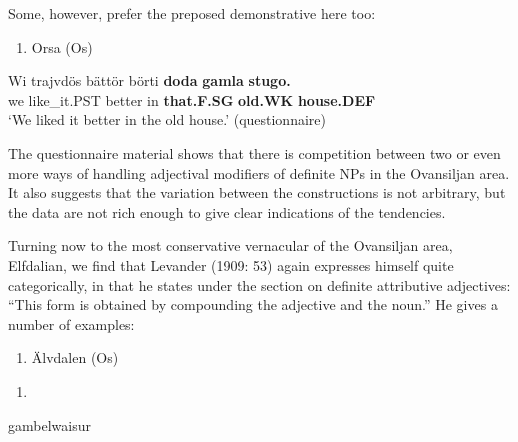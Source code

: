 Some, however, prefer the preposed demonstrative here too:

\begin{enumerate} %
\item 
Orsa (Os)

\end{enumerate} %
\ea\label{}
\gll Wi  trajvdös  bättör  börti  \textbf{doda} \textbf{gamla} \textbf{stugo.}\\


we  like\_it.PST  better  in  \textbf{that.F.SG} \textbf{old.WK} \textbf{house.DEF}\\ %


‘We liked it better in the old house.’ (questionnaire)
\z


The questionnaire material shows that there is competition between two or even more ways of handling adjectival modifiers of definite NPs in the Ovansiljan area. It also suggests that the variation between the constructions is not arbitrary, but the data are not rich enough to give clear indications of the tendencies. 

Turning now to the most conservative vernacular of the Ovansiljan area, Elfdalian, we find that Levander (1909: 53) again expresses himself quite categorically, in that he states under the section on definite attributive adjectives: “This form is obtained by compounding the adjective and the noun.” He gives a number of examples:

\begin{enumerate} %
\item 
\label{bkm:Ref150329355}Älvdalen (Os)

\end{enumerate} %
\setcounter{listLFOxcviiileveli}{0}
\begin{enumerate} %
\item 
\end{enumerate} %
\ea\label{}
\gll gambelwaisur\\


